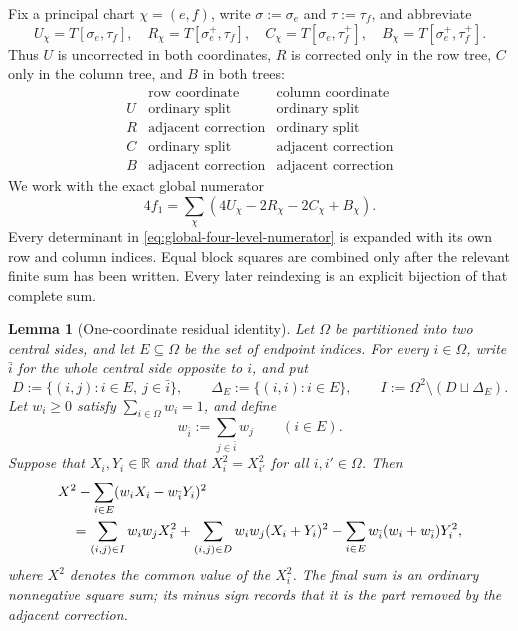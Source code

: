 \documentclass[11pt]{article}
\newtheorem{lemma}[theorem]{Lemma}
\begin{document}
Fix a principal chart $\chi=(e,f)$, write
$\sigma:=\sigma_e$ and $\tau:=\tau_f$, and abbreviate
\[
 U_\chi=T[\sigma_e,\tau_f],\quad
 R_\chi=T[\sigma_e^+,\tau_f],\quad
 C_\chi=T[\sigma_e,\tau_f^+],\quad
 B_\chi=T[\sigma_e^+,\tau_f^+].
\]
Thus $U$ is uncorrected in both coordinates, $R$ is corrected only in the
row tree, $C$ only in the column tree, and $B$ in both trees:
\[
\begin{array}{c|cc}
&\text{row coordinate}&\text{column coordinate}\\
\hline
U&\text{ordinary split}&\text{ordinary split}\\
R&\text{adjacent correction}&\text{ordinary split}\\
C&\text{ordinary split}&\text{adjacent correction}\\
B&\text{adjacent correction}&\text{adjacent correction}
\end{array}
\]
We work with the exact global numerator
\begin{equation}\label{eq:global-four-level-numerator}
4f_1=\sum_\chi(4U_\chi-2R_\chi-2C_\chi+B_\chi).
\end{equation}
Every determinant in \eqref{eq:global-four-level-numerator} is expanded with
its own row and column indices.  Equal block squares are combined only after
the relevant finite sum has been written.  Every later reindexing is an
explicit bijection of that complete sum.

\begin{lemma}[One-coordinate residual identity]
\label{lem:source-index-residual-passages}
Let $\Omega$ be partitioned into two central sides, and let
$E\subseteq\Omega$ be the set of endpoint indices.  For every $i\in\Omega$,
write $\bar i$ for the whole central side opposite to $i$, and put
\[
D:=\{(i,j):i\in E,\ j\in\bar i\},
\qquad
\Delta_E:=\{(i,i):i\in E\},
\qquad
I:=\Omega^2\setminus(D\sqcup\Delta_E).
\]
Let $w_i\ge0$ satisfy $\sum_{i\in\Omega}w_i=1$, and define
\[
w_{\bar i}:=\sum_{j\in\bar i}w_j \qquad (i\in E).
\]
Suppose that $X_i,Y_i\in\mathbb R$ and that $X_i^2=X_{i'}^2$ for
all $i,i'\in\Omega$.  Then
\begin{align}
&X^2-\sum_{i\in E}(w_iX_i-w_{\bar i}Y_i)^2 \notag\\
&\quad=
\sum_{(i,j)\in I}w_iw_jX_i^2
+\sum_{(i,j)\in D}w_iw_j(X_i+Y_i)^2
-\sum_{i\in E}w_{\bar i}(w_i+w_{\bar i})Y_i^2,
\label{eq:abstract-residual-partition}
\end{align}
where $X^2$ denotes the common value of the $X_i^2$.  The final sum is an
ordinary nonnegative square sum; its minus sign records that it is the part
removed by the adjacent correction.
\end{lemma}
\end{document}
